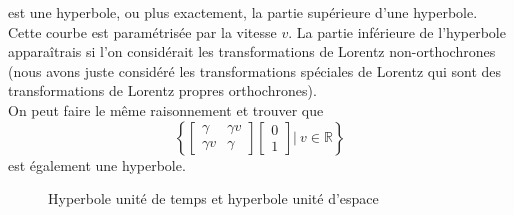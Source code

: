 \documentclass[a4paper,11pt]{report}
\begin{document}
            est une hyperbole, ou plus exactement, la partie supérieure d'une hyperbole. Cette courbe est paramétrisée par la vitesse $v$. La partie inférieure de l'hyperbole apparaîtrais si l'on considérait les transformations de Lorentz non-orthochrones (nous avons juste considéré les transformations spéciales de Lorentz qui sont des transformations de Lorentz propres orthochrones).\\
            
            On peut faire le même raisonnement et trouver que 
            \begin{equation}
            \left\{ \begin{bmatrix}
                \gamma & \gamma v \\
                \gamma v & \gamma 
            \end{bmatrix}
            \begin{bmatrix}
                    0\\
                    1
            \end{bmatrix} \Bigg\vert~ v\in\mathbb{R}\right\}
            \end{equation}
            est également une hyperbole.
            
            \begin{figure}[H]
            \centering
            \caption{Hyperbole unité de temps et hyperbole unité d'espace}
            \label{fig:my_label}
            \end{figure}
            
\end{document}
